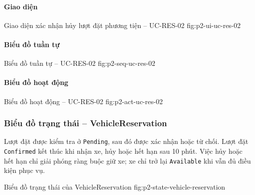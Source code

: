 \par\medskip
\noindent\begin{minipage}{\linewidth}
\paragraph{Giao diện}
  {Giao diện xác nhận hủy lượt đặt phương tiện -- UC-RES-02}
  {fig:p2-ui-uc-res-02}
  {}
\end{minipage}\par

\clearpage
\paragraph{Biểu đồ tuần tự}
  {Biểu đồ tuần tự -- UC-RES-02}
  {fig:p2-seq-uc-res-02}

\clearpage
\paragraph{Biểu đồ hoạt động}
  {Biểu đồ hoạt động -- UC-RES-02}
  {fig:p2-act-uc-res-02}

\clearpage

\subsubsection{Biểu đồ trạng thái -- VehicleReservation}

Lượt đặt được kiểm tra ở \texttt{Pending}, sau đó được xác nhận hoặc từ chối. Lượt đặt \texttt{Confirmed} kết thúc khi nhận xe, hủy hoặc hết hạn sau 10 phút. Việc hủy hoặc hết hạn chỉ giải phóng ràng buộc giữ xe; xe chỉ trở lại \texttt{Available} khi vẫn đủ điều kiện phục vụ.

  {Biểu đồ trạng thái của VehicleReservation}
  {fig:p2-state-vehicle-reservation}
  {}

\clearpage
